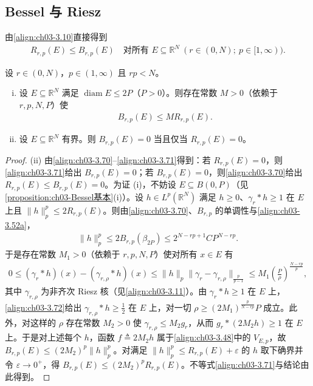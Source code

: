 \documentclass[../../main.tex]{subfiles}%
\begin{document}
\subsection{Bessel 与 Riesz}\label{subsection:ch03-BesselRiesz关系}

由\eqref{align:ch03-3.10}直接得到
\begin{align}
R_{r,p}(E)\leqslant B_{r,p}(E)\quad \text{对所有 }E\subseteq\mathbb{R}^N\ (r\in(0,N);\ p\in[1,\infty)).\label{align:ch03-3.70}
\end{align}

\begin{proposition}\label{proposition:ch03-BesselRiesz等价}
设 $r\in(0,N)$，$p\in(1,\infty)$ 且 $rp<N$。
\begin{enumerate}[(i)]
\item 设 $E\subseteq\mathbb{R}^N$ 满足 $\operatorname{diam}E\leqslant2P$（$P>0$）。则存在常数 $M>0$（依赖于 $r,p,N,P$）使
\begin{align}
B_{r,p}(E)\leqslant MR_{r,p}(E).\label{align:ch03-3.71}
\end{align}
\item 设 $E\subseteq\mathbb{R}^N$ 有界。则 $B_{r,p}(E)=0$ 当且仅当 $R_{r,p}(E)=0$。
\end{enumerate}
\end{proposition}

\begin{proof}
(ii) 由\eqref{align:ch03-3.70}--\eqref{align:ch03-3.71}得到：若 $R_{r,p}(E)=0$，则\eqref{align:ch03-3.71}给出 $B_{r,p}(E)=0$；若 $B_{r,p}(E)=0$，则\eqref{align:ch03-3.70}给出 $R_{r,p}(E)\leqslant B_{r,p}(E)=0$。为证 (i)，不妨设 $E\subseteq B(0,P)$（见\cref{proposition:ch03-Bessel基本}(i)）。设 $h\in L^p(\mathbb{R}^N)$ 满足 $h\geqslant0$、$\gamma_r*h\geqslant1$ 在 $E$ 上且 $\|h\|_p^p\leqslant2R_{r,p}(E)$。则由\eqref{align:ch03-3.70}、$B_{r,p}$ 的单调性与\eqref{align:ch03-3.52a}，
\begin{align*}
\|h\|_p^p\leqslant2B_{r,p}(\beta_{2P})\leqslant2^{N-rp+1}CP^{N-rp}.
\end{align*}
于是存在常数 $M_1>0$（依赖于 $r,p,N,P$）使对所有 $x\in E$ 有
\begin{align}
0\leqslant(\gamma_r*h)(x)-(\gamma_{r,\rho}*h)(x)
\leqslant\|h\|_p\|\gamma_r-\gamma_{r,\rho}\|_{\frac{p}{p-1}}
\leqslant M_1\left(\frac P\rho\right)^{\frac{N-rp}{p}},\label{align:ch03-3.72}
\end{align}
其中 $\gamma_{r,\rho}$ 为非齐次 Riesz 核（见\eqref{align:ch03-3.11}）。由 $\gamma_r*h\geqslant1$ 在 $E$ 上，\eqref{align:ch03-3.72}给出 $\gamma_{r,\rho}*h\geqslant\frac12$ 在 $E$ 上，对一切 $\rho\geqslant(2M_1)^{\frac p{N-rp}}P$ 成立。此外，对这样的 $\rho$ 存在常数 $M_2>0$ 使 $\gamma_{r,\rho}\leqslant M_2g_r$，从而 $g_r*(2M_2h)\geqslant1$ 在 $E$ 上。于是对上述每个 $h$，函数 $f\triangleq2M_2h$ 属于\eqref{align:ch03-3.48}中的 $V_{E,p}$，故 $B_{r,p}(E)\leqslant(2M_2)^p\|h\|_p^p$。对满足 $\|h\|_p^p\leqslant R_{r,p}(E)+\varepsilon$ 的 $h$ 取下确界并令 $\varepsilon\to0^+$，得 $B_{r,p}(E)\leqslant(2M_2)^pR_{r,p}(E)$。不等式\eqref{align:ch03-3.71}与结论由此得到。
\end{proof}
\end{document}
